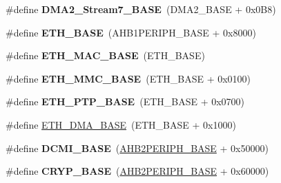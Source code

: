\begin{DoxyCompactItemize}
\item 
\hypertarget{group___peripheral__memory__map_gaa9faa708ad2440d24eb1064cba9bb06d}{\#define {\bfseries D\-M\-A2\-\_\-\-Stream7\-\_\-\-B\-A\-S\-E}~(D\-M\-A2\-\_\-\-B\-A\-S\-E + 0x0\-B8)}\label{group___peripheral__memory__map_gaa9faa708ad2440d24eb1064cba9bb06d}

\item 
\hypertarget{group___peripheral__memory__map_gad965a7b1106ece575ed3da10c45c65cc}{\#define {\bfseries E\-T\-H\-\_\-\-B\-A\-S\-E}~(A\-H\-B1\-P\-E\-R\-I\-P\-H\-\_\-\-B\-A\-S\-E + 0x8000)}\label{group___peripheral__memory__map_gad965a7b1106ece575ed3da10c45c65cc}

\item 
\hypertarget{group___peripheral__memory__map_ga3cf7005808feb61bff1fee01e50a711a}{\#define {\bfseries E\-T\-H\-\_\-\-M\-A\-C\-\_\-\-B\-A\-S\-E}~(E\-T\-H\-\_\-\-B\-A\-S\-E)}\label{group___peripheral__memory__map_ga3cf7005808feb61bff1fee01e50a711a}

\item 
\hypertarget{group___peripheral__memory__map_ga4946f2b3b03f7998343ac1778fbcf725}{\#define {\bfseries E\-T\-H\-\_\-\-M\-M\-C\-\_\-\-B\-A\-S\-E}~(E\-T\-H\-\_\-\-B\-A\-S\-E + 0x0100)}\label{group___peripheral__memory__map_ga4946f2b3b03f7998343ac1778fbcf725}

\item 
\hypertarget{group___peripheral__memory__map_gaa0f60b922aeb7275c785cbaa8f94ecf0}{\#define {\bfseries E\-T\-H\-\_\-\-P\-T\-P\-\_\-\-B\-A\-S\-E}~(E\-T\-H\-\_\-\-B\-A\-S\-E + 0x0700)}\label{group___peripheral__memory__map_gaa0f60b922aeb7275c785cbaa8f94ecf0}

\item 
\#define \hyperlink{group___peripheral__memory__map_gace2114e1b37c1ba88d60f3e831b67e93}{E\-T\-H\-\_\-\-D\-M\-A\-\_\-\-B\-A\-S\-E}~(E\-T\-H\-\_\-\-B\-A\-S\-E + 0x1000)
\item 
\hypertarget{group___peripheral__memory__map_ga55b794507e021135486de57129a2505c}{\#define {\bfseries D\-C\-M\-I\-\_\-\-B\-A\-S\-E}~(\hyperlink{group___peripheral__memory__map_gaeedaa71d22a1948492365e2cd26cfd46}{A\-H\-B2\-P\-E\-R\-I\-P\-H\-\_\-\-B\-A\-S\-E} + 0x50000)}\label{group___peripheral__memory__map_ga55b794507e021135486de57129a2505c}

\item 
\hypertarget{group___peripheral__memory__map_ga019f3ad3b3212e56b45984efd8b8efef}{\#define {\bfseries C\-R\-Y\-P\-\_\-\-B\-A\-S\-E}~(\hyperlink{group___peripheral__memory__map_gaeedaa71d22a1948492365e2cd26cfd46}{A\-H\-B2\-P\-E\-R\-I\-P\-H\-\_\-\-B\-A\-S\-E} + 0x60000)}\label{group___peripheral__memory__map_ga019f3ad3b3212e56b45984efd8b8efef}


\end{DoxyCompactItemize}
